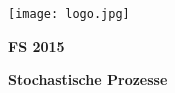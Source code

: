 \noindent
\begin{minipage}[t]{0.4\textwidth} 
\texttt{[image: logo.jpg]}
\end{minipage}%
\hfill%
\begin{minipage}[t]{0.4\textwidth}\raggedleft
\textbf{\large FS 2015}
\end{minipage}

\begin{center}
 \textbf{\large Stochastische Prozesse} \\
 \vspace{0.3cm}
\end{center}
